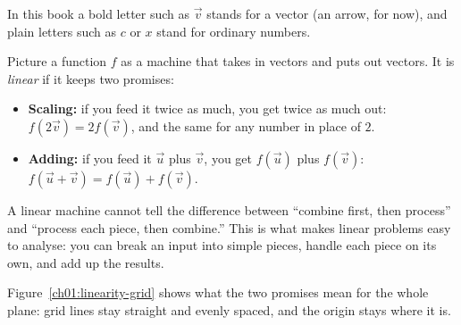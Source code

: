In this book a bold letter such as $\vec v$ stands for a vector (an arrow, for now), and plain letters
such as $c$ or $x$ stand for ordinary numbers.

\begin{intuitionbox}
Picture a function $f$ as a machine that takes in vectors and puts out vectors. It is \emph{linear}
if it keeps two promises:
\begin{itemize}
  \item \textbf{Scaling:} if you feed it twice as much, you get twice as much out: $f(2\vec v) = 2f(\vec v)$,
  and the same for any number in place of $2$.
  \item \textbf{Adding:} if you feed it $\vec u$ plus $\vec v$, you get $f(\vec u)$ plus $f(\vec v)$:
  $f(\vec u + \vec v) = f(\vec u) + f(\vec v)$.
\end{itemize}
A linear machine cannot tell the difference between ``combine first, then process'' and ``process
each piece, then combine.'' This is what makes linear problems easy to analyse: you can break an input
into simple pieces, handle each piece on its own, and add up the results.
\end{intuitionbox}

Figure~\ref{ch01:linearity-grid} shows what the two promises mean for the whole plane: grid lines stay
straight and evenly spaced, and the origin stays where it is.

